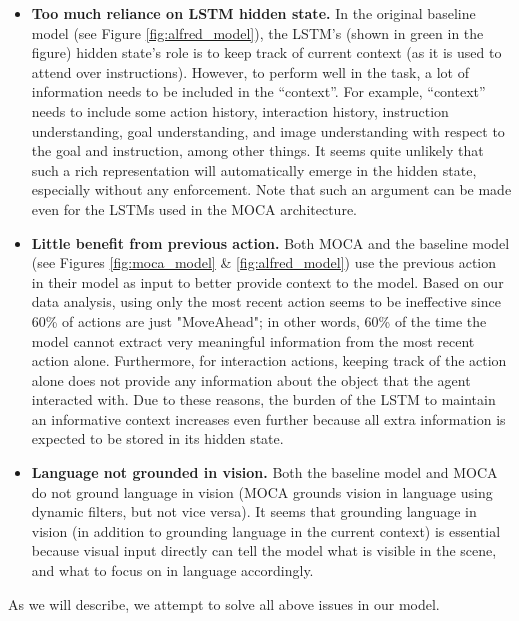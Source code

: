 \documentclass[11pt,a4paper]{article}
\begin{document}
\begin{itemize}
    \item \textbf{Too much reliance on LSTM hidden state.} In the original baseline model \cite{shridhar2020alfred} (see Figure \ref{fig:alfred_model}), the LSTM's (shown in green in the figure) hidden state's role is to keep track of current context (as it is used to attend over instructions). However, to perform well in the task, a lot of information needs to be included in the ``context''. For example, ``context'' needs to include some action history, interaction history, instruction understanding, goal understanding, and image understanding with respect to the goal and instruction, among other things. It seems quite unlikely that such a rich representation will automatically emerge in the hidden state, especially without any enforcement. Note that such an argument can be made even for the LSTMs used in the MOCA \cite{singh2020moca} architecture.
    \item \textbf{Little benefit from previous action.} Both MOCA \cite{singh2020moca} and the baseline model \cite{shridhar2020alfred} (see Figures \ref{fig:moca_model} \& \ref{fig:alfred_model}) use the previous action in their model as input to better provide context to the model.  Based on our data analysis, using only the most recent action seems to be ineffective since 60\% of actions are just "MoveAhead"; in other words, 60\% of the time the model cannot extract very meaningful information from the most recent action alone. Furthermore, for interaction actions, keeping track of the action alone does not provide any information about the object that the agent interacted with. Due to these reasons, the burden of the LSTM to maintain an informative context increases even further because all extra information is expected to be stored in its hidden state.
    \item \textbf{Language not grounded in vision.} Both the baseline model and MOCA do not ground language in vision (MOCA grounds vision in language using dynamic filters, but not vice versa). It seems that grounding language in vision (in addition to grounding language in the current context) is essential because visual input directly can tell the model what is visible in the scene, and what to focus on in language accordingly.
\end{itemize}

As we will describe, we attempt to solve all above issues in our model.
\end{document}
